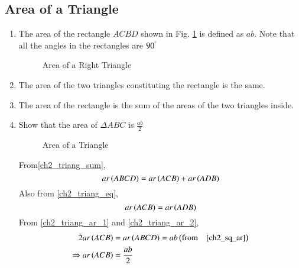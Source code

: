 \subsection{Area of a Triangle}
\renewcommand{\theequation}{\theenumi}
\begin{enumerate}[label=\arabic*.,ref=\thesubsection.\theenumi]
%



\item
	The area of the rectangle $ACBD$ shown in Fig. \ref{ch2_sq_ar} is defined as $ab$. Note that all the angles in the rectangles are $90^{\degree}$
	\label{ch2_sq_ar}

\begin{figure}[!ht]
	\begin{center}
		
		\resizebox{\columnwidth}{!}{}
	\end{center}
	\caption{Area of a Right Triangle}
	\label{ch2_sq_ar}	
\end{figure}

\item
	The area of the two triangles constituting the rectangle is the same.
	\label{ch2_triang_eq}

\item
	The area of the rectangle is the sum of the areas of the two triangles inside.
	\label{ch2_triang_sum}


\item
	Show that the area of $\Delta ABC$ is $\frac{ab}{2}$

\begin{figure}[!ht]
	\begin{center}
		
		\resizebox{\columnwidth}{!}{}
	\end{center}
	\caption{Area of a Triangle}
	\label{ch2_triang_ar}	
\end{figure}

\solution From\eqref{ch2_triang_sum},
\begin{equation}
\label{ch2_triang_ar_1}
ar\left(ABCD\right) = ar\left(ACB\right) + ar\left(ADB\right)
\end{equation}
Also from \eqref{ch2_triang_eq},
\begin{equation}
\label{ch2_triang_ar_2}
ar\left(ACB\right) = ar\left(ADB\right)
\end{equation}
From \eqref{ch2_triang_ar_1} and \eqref{ch2_triang_ar_2},
\begin{align}
2ar\left(ACB\right) &= ar\left(ABCD\right) = ab \left(\text{from} \quad \eqref{ch2_sq_ar}\right)
\\
\Rightarrow ar\left(ACB\right) &= \frac{ab}{2}
\end{align}


\end{enumerate}
